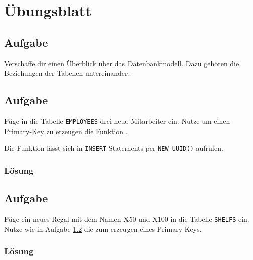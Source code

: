 \section{Übungsblatt}
\label{sec:uebung_02}

\subsection{Aufgabe}
\label{sec:uebung_02.aufgabe_01}
Verschaffe dir einen Überblick über das \hyperref[app:er-diagramm]{Datenbankmodell}. Dazu gehören die Beziehungen der Tabellen untereinander.


\subsection{Aufgabe}
\label{sec:uebung_02.aufgabe_02}
Füge in die Tabelle \texttt{EMPLOYEES} drei neue Mitarbeiter ein. Nutze um einen Primary-Key zu erzeugen die Funktion .

Die Funktion lässt sich in \texttt{INSERT}-Statements per \texttt{NEW\_UUID()} aufrufen.

\subsubsection*{Lösung}
\label{sec:uebung_02.aufgabe_02.loesung}

\subsection{Aufgabe}
\label{sec:uebung_02.aufgabe_03}
Füge ein neues Regal mit dem Namen X50 und X100 in die Tabelle \texttt{SHELFS} ein. Nutze wie in Aufgabe \ref{sec:uebung_02.aufgabe_02} die  zum erzeugen eines Primary Keys.

\subsubsection*{Lösung}
\label{sec:uebung_02.aufgabe_03.loesung}

